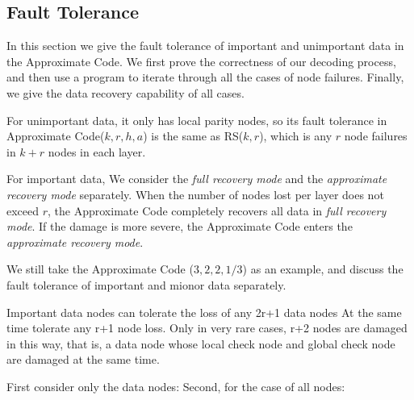 \documentclass[sigconf]{acmart}
\begin{document}
\subsection{Fault Tolerance}
In this section we give the fault tolerance of important and unimportant data in the Approximate Code.
We first prove the correctness of our decoding process, and then use a program to 
iterate through all the cases of node failures. Finally, we give the data recovery capability of all cases.

For unimportant data, it only has local parity nodes, so its fault tolerance in Approximate Code($k,r,h,a$) is the same as RS($k,r$), which is any $r$ node failures in $k+r$ nodes in each layer.

For important data, We consider the \emph{full recovery mode} and the \emph{approximate recovery mode} separately. When the number of nodes lost per layer does not exceed $r$, the Approximate Code completely recovers all data in \emph{full recovery mode}. If the damage is more severe, the Approximate Code enters the \emph{approximate recovery mode}.


We still take the Approximate Code ($3, 2, 2, 1/3$) as an example, and discuss the fault tolerance of important and mionor data separately.


Important data nodes can tolerate the loss of any 2r+1 data nodes
At the same time tolerate any r+1 node loss. Only in very rare cases, r+2 nodes are damaged in this way, that is, a data node whose local check node and global check node are damaged at the same time.

First consider only the data nodes:
Second, for the case of all nodes:

\end{document}
